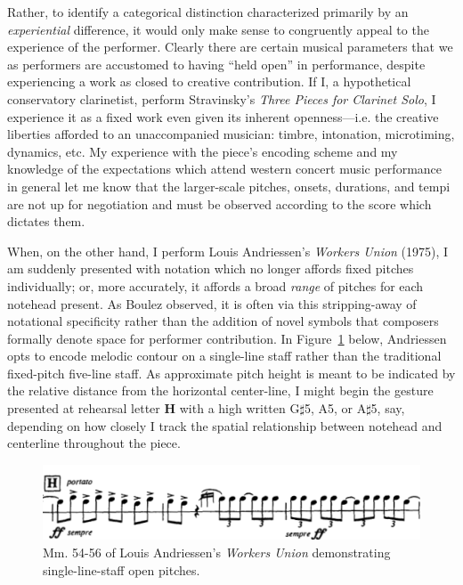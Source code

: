     Rather, to identify a categorical distinction characterized primarily by an \textit{experiential} difference, it would only make sense to congruently appeal to the experience of the performer. Clearly there are certain musical parameters that we as performers are accustomed to having ``held open'' in performance, despite experiencing a work as closed to creative contribution. If I, a hypothetical conservatory clarinetist, perform Stravinsky's \textit{Three Pieces for Clarinet Solo}, I experience it as a fixed work even given its inherent openness---i.e. the creative liberties afforded to an unaccompanied musician: timbre, intonation, microtiming, dynamics, etc. My experience with the piece's encoding scheme and my knowledge of the expectations which attend western concert music performance in general let me know that the larger-scale pitches, onsets, durations, and tempi are not up for negotiation and must be observed according to the score which dictates them. 
    
    When, on the other hand, I perform Louis Andriessen's \textit{Workers Union} (1975), I am suddenly presented with notation which no longer affords fixed pitches individually; or, more accurately, it affords a broad \textit{range} of pitches for each notehead present. As Boulez observed, it is often via this stripping-away of notational specificity rather than the addition of novel symbols that composers formally denote space for performer contribution. In Figure~\ref{fig:workersunion} below, Andriessen opts to encode melodic contour on a single-line staff rather than the traditional fixed-pitch five-line staff. As approximate pitch height is meant to be indicated by the relative distance from the horizontal center-line, I might begin the gesture presented at rehearsal letter \textbf{H} with a high written G$\sharp$5, A5, or A$\sharp$5, say, depending on how closely I track the spatial relationship between notehead and centerline throughout the piece.

            \begin{figure} 
            \centering
            \includegraphics[width=.9\textwidth]{images/chapter2/workers_union.png}
            \captionsetup{width=.5\textwidth}
            \caption[Mm. 54-56 of Louis Andriessen's \textit{Workers Union} featuring single-line-staff notation denoting open pitches.]{Mm. 54-56 of Louis Andriessen's \textit{Workers Union} demonstrating single-line-staff open pitches.\footnotemark}
            \label{fig:workersunion}
        \end{figure}
        
